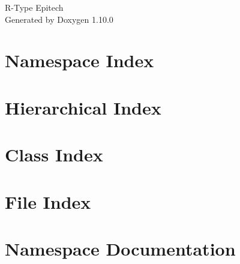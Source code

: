 \documentclass[twoside]{book}
\newcommand{\+}{\discretionary{\mbox{\scriptsize$\hookleftarrow$}}{}{}}
\newcommand{\clearemptydoublepage}{%
    \newpage{\pagestyle{empty}\cleardoublepage}%
  }
\begin{document}
  \raggedbottom
    \hypersetup{pageanchor=false,
                bookmarksnumbered=true,
                pdfencoding=unicode
               }
  \begin{titlepage}
  \vspace*{7cm}
  \begin{center}%
  {\Large R-\/\+Type Epitech}\\
  \vspace*{1cm}
  {\large Generated by Doxygen 1.10.0}\\
  \end{center}
  \end{titlepage}
  \clearemptydoublepage
  \tableofcontents
  \clearemptydoublepage
  \hypersetup{pageanchor=true}

\chapter{Namespace Index}

\chapter{Hierarchical Index}

\chapter{Class Index}

\chapter{File Index}

\chapter{Namespace Documentation}


\end{document}
